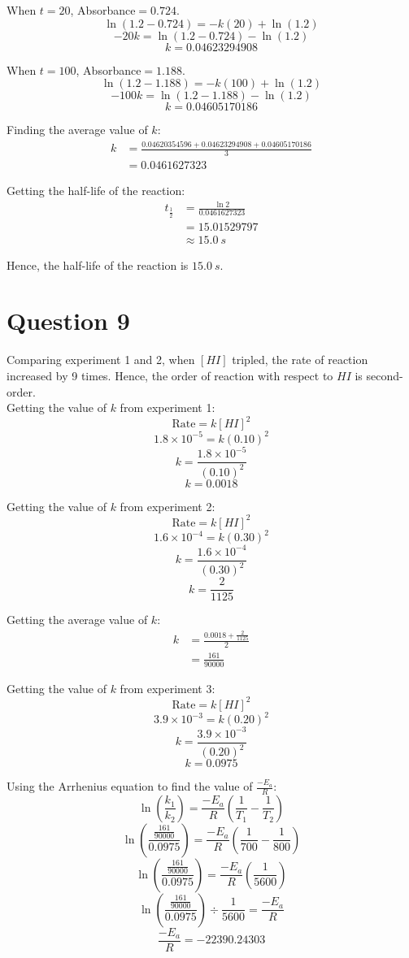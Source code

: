 \documentclass[11pt]{article}
\begin{document}
When \(t = 20\), Absorbance\(= 0.724\).
\[\ln (1.2 - 0.724) = - k(20) + \ln (1.2)\]
\[-20k = \ln (1.2 - 0.724) - \ln (1.2)\]
\[k = 0.04623294908\]

When \(t = 100\), Absorbance\(= 1.188\).
\[\ln (1.2 - 1.188) = - k(100) + \ln (1.2)\]
\[-100k = \ln (1.2 - 1.188) - \ln (1.2)\]
\[k = 0.04605170186\]

Finding the average value of \(k\):
\begin{align*}
k &= \frac{0.04620354596 + 0.04623294908 + 0.04605170186}{3} \\
&= 0.0461627323
\end{align*}

Getting the half-life of the reaction:
\begin{align*}
t_{\frac{1}{2}} &= \frac{\ln 2}{0.0461627323} \\
&= 15.01529797 \\
&\approx \qty{15.0}{\unit{s}}
\end{align*}

Hence, the half-life of the reaction is \(\qty{15.0}{\unit{s}}\).


\section{Question 9}
\label{sec:orgdf0ac22}

Comparing experiment 1 and 2, when \([HI]\) tripled, the rate of reaction increased by 9 times. Hence, the order of reaction with respect to \(HI\) is second-order.
\\[0pt]

Getting the value of \(k\) from experiment 1:
\[\text{Rate} = k[HI]^2\]
\[1.8 \times 10^{-5} = k(0.10)^2\]
\[k = \frac{1.8 \times 10^{-5}}{(0.10)^2}\]
\[k = 0.0018\]

Getting the value of \(k\) from experiment 2:
\[\text{Rate} = k[HI]^2\]
\[1.6 \times 10^{-4} = k(0.30)^2\]
\[k = \frac{1.6 \times 10^{-4}}{(0.30)^2}\]
\[k = \frac{2}{1125}\]

Getting the average value of \(k\):
\begin{align*}
k &= \frac{0.0018 + \frac{2}{1125}}{2} \\
&= \frac{161}{90000}
\end{align*}

Getting the value of \(k\) from experiment 3:
\[\text{Rate} = k[HI]^2\]
\[3.9 \times 10^{-3} = k(0.20)^2\]
\[k = \frac{3.9 \times 10^{-3}}{(0.20)^2}\]
\[k = 0.0975\]

Using the Arrhenius equation to find the value of \(\frac{-E_a}{R}\):
\[\ln \left( \frac{k_1}{k_2} \right) = \frac{-E_a}{R} \left(\frac{1}{T_1} - \frac{1}{T_2} \right)\]
\[\ln \left( \frac{\frac{161}{90000}}{0.0975} \right) = \frac{-E_a}{R} \left( \frac{1}{700} - \frac{1}{800}\right)\]
\[\ln \left( \frac{\frac{161}{90000}}{0.0975} \right) = \frac{-E_a}{R} \left( \frac{1}{5600} \right)\]
\[\ln \left( \frac{\frac{161}{90000}}{0.0975} \right) \div \frac{1}{5600} = \frac{-E_a}{R}\]
\[\frac{-E_a}{R} = -22390.24303\]
\end{document}
